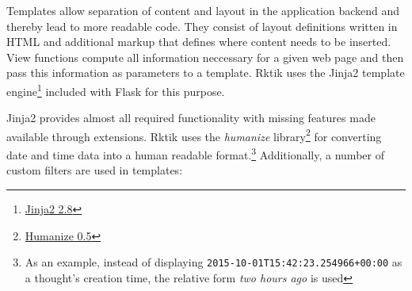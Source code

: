 
Templates allow separation of content and layout in the application
backend and thereby lead to more readable code. They consist of layout
definitions written in HTML and additional markup that defines where
content needs to be inserted. View functions compute all information
neccessary for a given web page and then pass this information as
parameters to a template. Rktik uses the Jinja2 template
engine\footnote{\href{https://pypi.python.org/pypi/Jinja2/2.8}{Jinja2
  2.8}} included with Flask for this purpose.

Jinja2 provides almost all required functionality with missing features
made available through extensions. Rktik uses the \emph{humanize}
library\footnote{\href{https://pypi.python.org/pypi/humanize/0.5}{Humanize
  0.5}} for converting date and time data into a human readable
format.\footnote{As an example, instead of displaying
  \texttt{2015-10-01T15:42:23.254966+00:00} as a thought's creation
  time, the relative form \emph{two hours ago} is used} Additionally, a
number of custom filters are used in templates:

